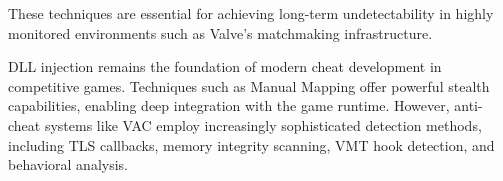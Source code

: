 These techniques are essential for achieving long-term undetectability in highly monitored environments such as Valve’s matchmaking infrastructure.


DLL injection remains the foundation of modern cheat development in competitive games. Techniques such as Manual Mapping offer powerful stealth capabilities, enabling deep integration with the game runtime. However, anti-cheat systems like VAC employ increasingly sophisticated detection methods, including TLS callbacks, memory integrity scanning, VMT hook detection, and behavioral analysis.
